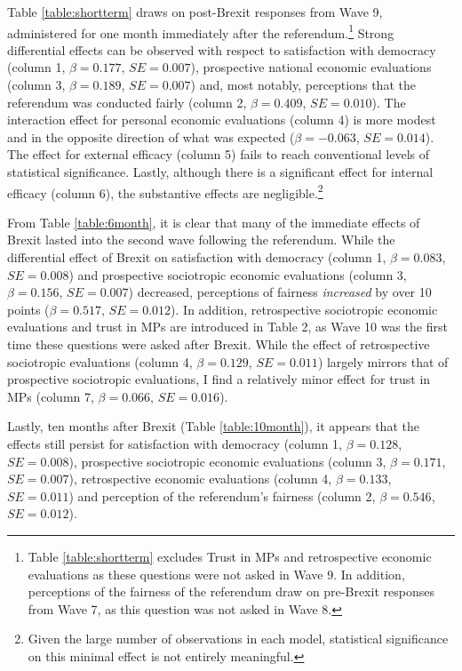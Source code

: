 \documentclass[12pt, letter]{article}
\begin{document}
Table \ref{table:shortterm} draws on post-Brexit responses from Wave 9, administered for one month immediately after the referendum.\footnote{Table \ref{table:shortterm} excludes Trust in MPs and retrospective economic evaluations as these questions were not asked in Wave 9. In addition, perceptions of the fairness of the referendum draw on pre-Brexit responses from Wave 7, as this question was not asked in Wave 8.} Strong differential effects can be observed with respect to satisfaction with democracy  (column 1, $\beta = 0.177$, $SE = 0.007$), prospective national economic evaluations (column 3, $\beta = 0.189$, $SE = 0.007$) and, most notably, perceptions that the referendum was conducted fairly (column 2, $\beta = 0.409$, $SE = 0.010$). The interaction effect for personal economic evaluations (column 4) is more modest and in the opposite direction of what was expected ($\beta = -0.063$, $SE = 0.014$). The effect for external efficacy (column 5) fails to reach conventional levels of statistical significance. Lastly, although there is a significant effect for internal efficacy (column 6), the substantive effects are negligible.\footnote{Given the large number of observations in each model, statistical significance on this minimal effect is not entirely meaningful.}

From Table \ref{table:6month}, it is clear that many of the immediate effects of Brexit lasted into the second wave following the referendum. While the differential effect of Brexit on satisfaction with democracy (column 1, $\beta = 0.083$, $SE = 0.008$) and prospective sociotropic economic evaluations (column 3, $\beta = 0.156$, $SE = 0.007$) decreased, perceptions of fairness \textit{increased} by over 10 points ($\beta = 0.517$, $SE = 0.012$). In addition, retrospective sociotropic economic evaluations and trust in MPs are introduced in Table 2, as Wave 10 was the first time these questions were asked after Brexit. While the effect of retrospective sociotropic evaluations (column 4, $\beta = 0.129$, $SE = 0.011$) largely mirrors that of prospective sociotropic evaluations, I find a relatively minor effect for trust in MPs (column 7, $\beta = 0.066$, $SE = 0.016$). 

Lastly, ten months after Brexit (Table \ref{table:10month}), it appears that the effects still persist for satisfaction with democracy (column 1, $\beta = 0.128$, $SE = 0.008$), prospective sociotropic economic evaluations (column 3, $\beta = 0.171$, $SE = 0.007$), retrospective economic evaluations (column 4, $\beta = 0.133$, $SE = 0.011$) and perception of the referendum's fairness (column 2, $\beta = 0.546$, $SE = 0.012$). 
\end{document}

